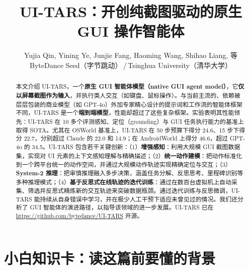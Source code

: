 \documentclass[11pt,UTF8,fontset=fandol]{ctexart}
\title{\textbf{UI-TARS：开创纯截图驱动的原生 GUI 操作智能体}}
\author{Yujia Qin, Yining Ye, Junjie Fang, Haoming Wang, Shihao Liang, 等\\
ByteDance Seed（字节跳动）\,/\,Tsinghua University（清华大学）}
\date{}
\begin{document}
\maketitle

\begin{center}
\end{center}

\begin{abstract}
\noindent 本文介绍 UI-TARS，一个\textbf{原生 GUI 智能体模型（native GUI agent model）}，它\textbf{仅以屏幕截图作为输入}，并执行类人交互（如键盘、鼠标操作）。与当前主流的、依赖被层层包装的商业模型（如 GPT-4o）外加专家精心设计的提示词和工作流的智能体框架不同，UI-TARS 是一个\textbf{端到端模型}，性能却超过了这些复杂框架。实验表明其性能领先：UI-TARS 在 10 多个评测感知、定位（grounding）与 GUI 任务执行能力的基准上取得 SOTA。尤其在 OSWorld 基准上，UI-TARS 在 50 步预算下得分 24.6、15 步下得分 22.7，分别超过 Claude 的 22.0 和 14.9；在 AndroidWorld 上得分 46.6，超过 GPT-4o 的 34.5。UI-TARS 包含若干关键创新：（1）\textbf{增强感知}：利用大规模 GUI 截图数据集，实现对 UI 元素的上下文感知理解与精确描述；（2）\textbf{统一动作建模}：把动作标准化到一个跨平台统一的动作空间，并通过大规模动作轨迹实现精确定位与交互；（3）\textbf{System-2 推理}：把审慎推理融入多步决策，涵盖任务分解、反思思考、里程碑识别等多种推理模式；（4）\textbf{基于反思式在线轨迹的迭代训练}：通过在数百台虚拟机上自动采集、筛选并反思式精炼新的交互轨迹来突破数据瓶颈。通过迭代训练与反思微调，UI-TARS 能持续从自身错误中学习，并在极少人工干预下适应未曾见过的情况。我们还分析了 GUI 智能体的演进路径，以指导该领域的进一步发展。UI-TARS 已在 \url{https://github.com/bytedance/UI-TARS} 开源。
\end{abstract}

\section{小白知识卡：读这篇前要懂的背景}
\end{document}
